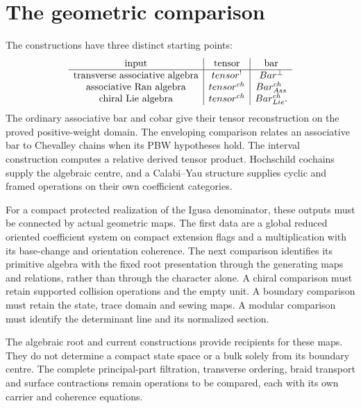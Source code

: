 \section{The geometric comparison}
The constructions have three distinct starting points:
\[
\begin{array}{c|c|c}
\text{input}&\text{tensor}&\text{bar}\\ \hline
\text{transverse associative algebra}&tensor^!&Bar^{\perp}\\
\text{associative Ran algebra}&tensor^{ch}&Bar^{ch}_{Ass}\\
\text{chiral Lie algebra}&tensor^{ch}&Bar^{ch}_{Lie}.
\end{array}
\]
The ordinary associative bar and cobar give their tensor reconstruction on the
proved positive-weight domain. The enveloping comparison relates an
associative bar to Chevalley chains when its PBW hypotheses hold.
The interval construction computes a relative derived tensor product.
Hochschild cochains supply the algebraic centre, and a Calabi--Yau structure
supplies cyclic and framed operations on their own coefficient categories.

For a compact protected realization of the Igusa denominator, these outputs
must be connected by actual geometric maps. The first data are a global
reduced oriented coefficient system on compact extension flags and a multiplication
with its base-change and orientation coherence. The next comparison identifies
its primitive algebra with the fixed root presentation through the generating
maps and relations, rather than through the character alone.
A chiral comparison must retain supported collision operations and the empty
unit. A boundary comparison must retain the state, trace domain and sewing maps.
A modular comparison must identify the determinant line and its normalized section.

The algebraic root and current constructions provide recipients for these maps.
They do not determine a compact state space or a bulk solely from its boundary
centre. The complete principal-part filtration, transverse ordering, braid
transport and surface contractions remain operations to be compared, each with
its own carrier and coherence equations.

